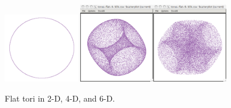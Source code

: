 \documentclass[article]{jss}
\begin{document}
\begin{figure}[ht]
\centerline{\includegraphics[width=1.3in]{torus-flat-2.pdf} \includegraphics[width=1.3in]{torus-flat-4.pdf}\includegraphics[width=1.3in]{torus-flat-6.pdf}}
\caption{Flat tori in 2-D, 4-D, and 6-D.}
\label{flat1}
\end{figure}
\end{document}
